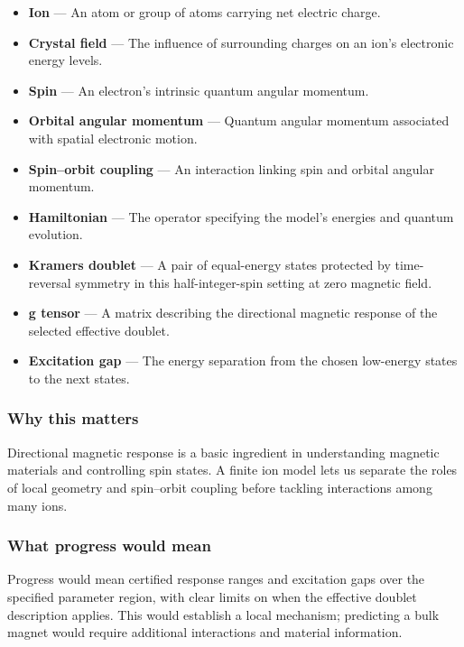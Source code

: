 \documentclass[
  11pt,
]{article}
\begin{document}
\begin{itemize}
\item
  \textbf{Ion} --- An atom or group of atoms carrying net electric
  charge.
\item
  \textbf{Crystal field} --- The influence of surrounding charges on an
  ion's electronic energy levels.
\item
  \textbf{Spin} --- An electron's intrinsic quantum angular momentum.
\item
  \textbf{Orbital angular momentum} --- Quantum angular momentum
  associated with spatial electronic motion.
\item
  \textbf{Spin--orbit coupling} --- An interaction linking spin and
  orbital angular momentum.
\item
  \textbf{Hamiltonian} --- The operator specifying the model's energies
  and quantum evolution.
\item
  \textbf{Kramers doublet} --- A pair of equal-energy states protected
  by time-reversal symmetry in this half-integer-spin setting at zero
  magnetic field.
\item
  \textbf{g tensor} --- A matrix describing the directional magnetic
  response of the selected effective doublet.
\item
  \textbf{Excitation gap} --- The energy separation from the chosen
  low-energy states to the next states.
\end{itemize}

\subsubsection{Why this matters}

Directional magnetic response is a basic ingredient in understanding
magnetic materials and controlling spin states. A finite ion model lets
us separate the roles of local geometry and spin--orbit coupling before
tackling interactions among many ions.

\subsubsection{What progress would mean}

Progress would mean certified response ranges and excitation gaps over
the specified parameter region, with clear limits on when the effective
doublet description applies. This would establish a local mechanism;
predicting a bulk magnet would require additional interactions and
material information.
\end{document}
